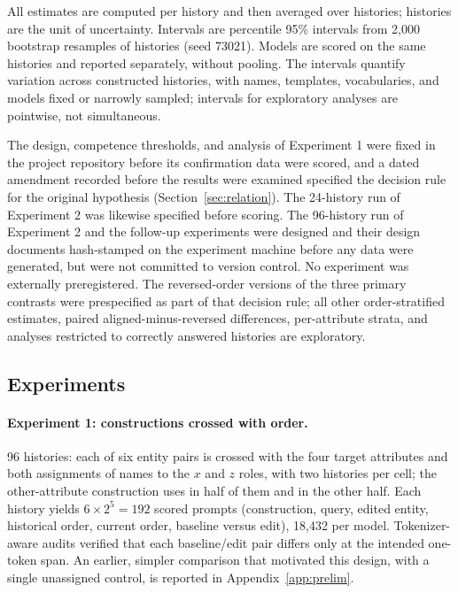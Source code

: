 All estimates are computed per history and then averaged over histories; histories are the unit of uncertainty. Intervals are percentile 95\% intervals from 2,000 bootstrap resamples of histories (seed 73021). Models are scored on the same histories and reported separately, without pooling. The intervals quantify variation across constructed histories, with names, templates, vocabularies, and models fixed or narrowly sampled; intervals for exploratory analyses are pointwise, not simultaneous.

The design, competence thresholds, and analysis of Experiment 1 were fixed in the project repository before its confirmation data were scored, and a dated amendment recorded before the results were examined specified the decision rule for the original hypothesis (Section~\ref{sec:relation}). The 24-history run of Experiment 2 was likewise specified before scoring. The 96-history run of Experiment 2 and the follow-up experiments were designed and their design documents hash-stamped on the experiment machine before any data were generated, but were not committed to version control. No experiment was externally preregistered. The reversed-order versions of the three primary contrasts were prespecified as part of that decision rule; all other order-stratified estimates, paired aligned-minus-reversed differences, per-attribute strata, and analyses restricted to correctly answered histories are exploratory.

\subsection{Experiments}
\label{sec:exp1}
\label{sec:marker-protocol}
\label{sec:followup-design}

\paragraph{Experiment 1: constructions crossed with order.} 96 histories: each of six entity pairs is crossed with the four target attributes and both assignments of names to the $x$ and $z$ roles, with two histories per cell; the other-attribute construction uses  in half of them and  in the other half. Each history yields $6\times2^5=192$ scored prompts (construction, query, edited entity, historical order, current order, baseline versus edit), 18,432 per model. Tokenizer-aware audits verified that each baseline/edit pair differs only at the intended one-token span. An earlier, simpler comparison that motivated this design, with a single unassigned control, is reported in Appendix~\ref{app:prelim}.

